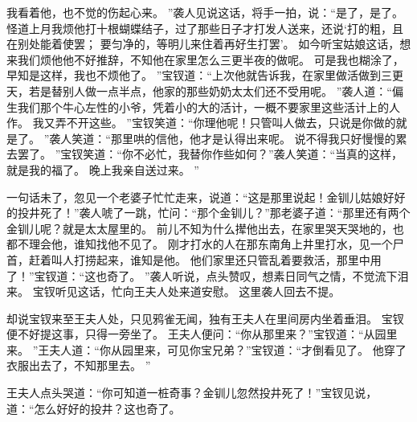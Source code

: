 我看着他，也不觉的伤起心来。
”袭人见说这话，将手一拍，说：“是了，是了。
怪道上月我烦他打十根蝴蝶结子，过了那些日子才打发人送来，还说‘打的粗，且在别处能着使罢；
要匀净的，等明儿来住着再好生打罢’。
如今听宝姑娘这话，想来我们烦他他不好推辞，不知他在家里怎么三更半夜的做呢。
可是我也糊涂了，早知是这样，我也不烦他了。
”宝钗道：“上次他就告诉我，在家里做活做到三更天，若是替别人做一点半点，他家的那些奶奶太太们还不受用呢。
”袭人道：“偏生我们那个牛心左性的小爷，凭着小的大的活计，一概不要家里这些活计上的人作。
我又弄不开这些。
”宝钗笑道：“你理他呢！只管叫人做去，只说是你做的就是了。
”袭人笑道：“那里哄的信他，他才是认得出来呢。
说不得我只好慢慢的累去罢了。
”宝钗笑道：“你不必忙，我替你作些如何？”袭人笑道：“当真的这样，就是我的福了。
晚上我亲自送过来。
”\par
一句话未了，忽见一个老婆子忙忙走来，说道：“这是那里说起！金钏儿姑娘好好的投井死了！”袭人唬了一跳，忙问：“那个金钏儿？”那老婆子道：“那里还有两个金钏儿呢？就是太太屋里的。
前儿不知为什么撵他出去，在家里哭天哭地的，也都不理会他，谁知找他不见了。
刚才打水的人在那东南角上井里打水，见一个尸首，赶着叫人打捞起来，谁知是他。
他们家里还只管乱着要救活，那里中用了！”宝钗道：“这也奇了。
”袭人听说，点头赞叹，想素日同气之情，不觉流下泪来。
宝钗听见这话，忙向王夫人处来道安慰。
这里袭人回去不提。
\par
却说宝钗来至王夫人处，只见鸦雀无闻，独有王夫人在里间房内坐着垂泪。
宝钗便不好提这事，只得一旁坐了。
王夫人便问：“你从那里来？”宝钗道：“从园里来。
”王夫人道：“你从园里来，可见你宝兄弟？”宝钗道：“才倒看见了。
他穿了衣服出去了，不知那里去。
”\par
王夫人点头哭道：“你可知道一桩奇事？金钏儿忽然投井死了！”宝钗见说，道：“怎么好好的投井？这也奇了。
